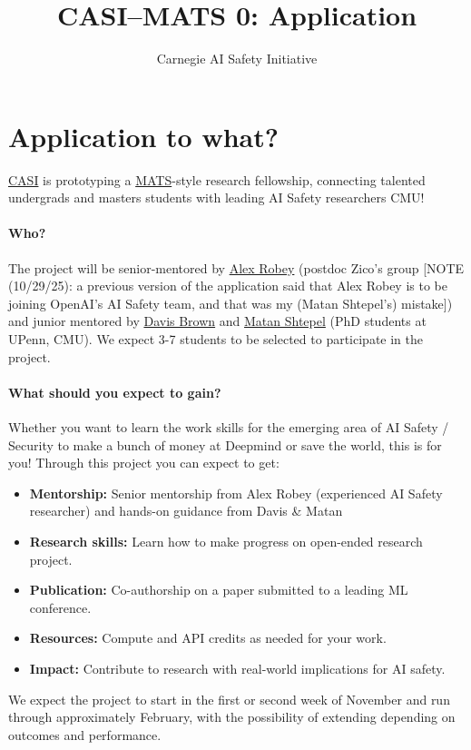 \documentclass[11pt]{article}
\title{CASI--MATS 0: Application}
\author{Carnegie AI Safety Initiative}
\begin{document}
\maketitle


\section{Application to what?}

\href{https://cmuaisafety.com/}{CASI} is prototyping a \href{https://www.matsprogram.org/}{MATS}-style research fellowship, connecting talented undergrads and masters students with leading AI Safety researchers \@ CMU! 

\paragraph{Who?}
The project will be senior-mentored by \href{https://arobey1.github.io/}{Alex Robey} (postdoc \@ Zico's group {{\color{red} [NOTE (10/29/25): a previous version of the application said that Alex Robey is to be joining OpenAI's AI Safety team, and that was my (Matan Shtepel's) mistake]}}) and junior mentored by \href{https://davisrbrown.com/}{Davis Brown} and \href{https://matanshtepel.com/}{Matan Shtepel} (PhD students at UPenn, CMU).
We expect 3-7 students to be selected to participate in the project.

\paragraph{What should you expect to gain?}
Whether you want to learn the work skills for the emerging area of AI Safety / Security to make a bunch of money at Deepmind or save the world, this is for you! Through this project you can expect to get:   

\begin{itemize}[noitemsep]
    \item \textbf{Mentorship:} Senior mentorship from Alex Robey (experienced AI Safety researcher) and hands-on guidance from Davis \& Matan
    \item \textbf{Research skills:} Learn how to make progress on open-ended research project.
    \item \textbf{Publication:} Co-authorship on a paper submitted to a leading ML conference.
    \item \textbf{Resources:} Compute and API credits as needed for your work.
    \item \textbf{Impact:} Contribute to research with real-world implications for AI safety.
\end{itemize}
We expect the project to start in the first or second week of November and run through approximately February, with the possibility of extending depending on outcomes and performance. 
\end{document}
